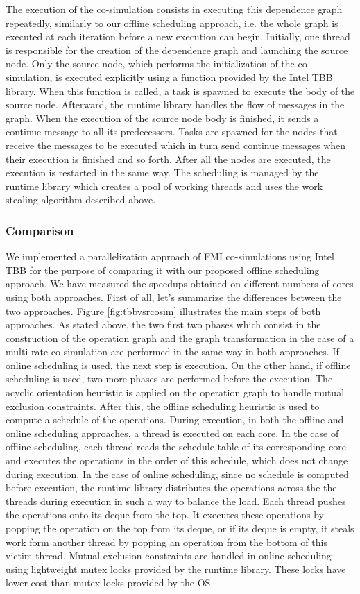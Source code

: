 The execution of the co-simulation consists in executing this dependence graph repeatedly, similarly to our offline scheduling approach, i.e. the whole graph is executed at each iteration before a new execution can begin. Initially, one thread is responsible for the creation of the dependence graph and launching the source node. Only the source node, which performs the initialization of the co-simulation, is executed explicitly using a function provided by the Intel TBB library. When this function is called, a task is spawned to execute the body of the source node. Afterward, the runtime library handles the flow of messages in the graph. When the execution of the source node body is finished, it sends a continue message to all its predecessors. Tasks are spawned for the nodes that receive the messages to be executed which in turn send continue messages when their execution is finished and so forth. After all the nodes are executed, the execution is restarted in the same way. The scheduling is managed by the runtime library which creates a pool of working threads and uses the work stealing algorithm described above.

\subsubsection{Comparison}

We implemented a parallelization approach of FMI co-simulations using Intel TBB for the purpose of comparing it with our proposed offline scheduling approach. We have measured the speedups obtained on different numbers of cores using both approaches. First of all, let's summarize the differences between the two approaches. Figure \ref{fig:tbbvsrcosim} illustrates the main steps of both approaches. As stated above, the two first two phases which consist in the construction of the operation graph and the graph transformation in the case of a multi-rate co-simulation are performed in the same way in both approaches. If online scheduling is used, the next step is execution. On the other hand, if offline scheduling is used, two more phases are performed before the execution. The acyclic orientation heuristic is applied on the operation graph to handle mutual exclusion constraints. After this, the offline scheduling heuristic is used to compute a schedule of the operations. During execution, in both the offline and online scheduling approaches, a thread is executed on each core. In the case of offline scheduling, each thread reads the schedule table of its corresponding core and executes the operations in the order of this schedule, which does not change during execution. In the case of online scheduling, since no schedule is computed before execution, the runtime library distributes the operations across the the threads during execution in such a way to balance the load. Each thread pushes the operations onto its deque from the top. It executes these operations by popping the operation on the top from its deque, or if its deque is empty, it steals work form another thread by popping an operation from the bottom of this victim thread. Mutual exclusion constraints are handled in online scheduling using lightweight mutex locks provided by the runtime library. These locks have lower cost than mutex locks provided by the OS. 

